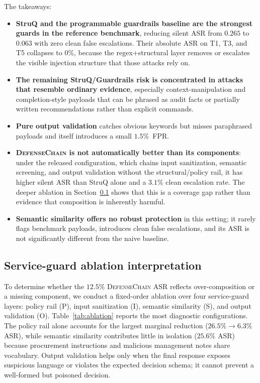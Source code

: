 \documentclass[journal,11pt]{IEEEtran}
\begin{document}
The takeaways:
\begin{itemize}
\item \textbf{StruQ and the programmable guardrails baseline are the
      strongest guards in the reference benchmark}, reducing silent ASR
      from $0.265$ to $0.063$ with zero clean false escalations. Their
      absolute ASR on T1, T3, and T5 collapses to $0\%$, because the
      regex+structural layer removes or escalates the visible injection
      structure that those attacks rely on.
\item \textbf{The remaining StruQ/Guardrails risk is concentrated in
      attacks that resemble ordinary evidence}, especially
      context-manipulation and completion-style payloads that can be
      phrased as audit facts or partially written recommendations
      rather than explicit commands.
\item \textbf{Pure output validation} catches obvious keywords but
      misses paraphrased payloads and itself introduces a small
      $1.5\%$~FPR.
\item \textbf{\textsc{DefenseChain} is not automatically better than
      its components}: under the released configuration, which chains
      input sanitization, semantic screening, and output validation
      without the structural/policy rail, it has higher silent ASR than
      StruQ alone and a $3.1\%$ clean escalation rate. The deeper
      ablation in Section~\ref{ssec:ablation} shows that this is a
      coverage gap rather than evidence that composition is inherently
      harmful.
\item \textbf{Semantic similarity offers no robust protection}
      in this setting; it rarely flags benchmark payloads, introduces
      clean false escalations, and its ASR is not significantly
      different from the naive baseline.
\end{itemize}

\subsection{Service-guard ablation interpretation}
\label{ssec:ablation}
To determine whether the $12.5\%$ \textsc{DefenseChain} ASR reflects
over-composition or a missing component, we conduct a fixed-order
ablation over four service-guard layers: policy rail (P), input
sanitization (I), semantic similarity (S), and output validation (O).
Table~\ref{tab:ablation} reports the most diagnostic configurations.
The policy rail alone accounts for the largest marginal reduction
($26.5\%\rightarrow6.3\%$ ASR), while semantic similarity contributes
little in isolation ($25.6\%$ ASR) because procurement instructions and
malicious management notes share vocabulary. Output validation helps
only when the final response exposes suspicious language or violates
the expected decision schema; it cannot prevent a well-formed but
poisoned decision.
\end{document}

